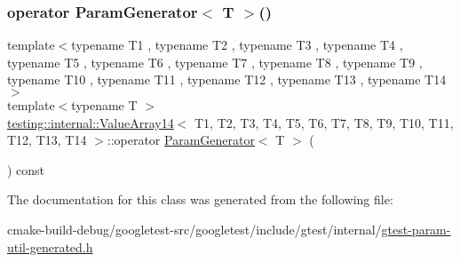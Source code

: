\subsubsection{\texorpdfstring{operator ParamGenerator$<$ T $>$()}{operator ParamGenerator< T >()}}
{\footnotesize\ttfamily template$<$typename T1 , typename T2 , typename T3 , typename T4 , typename T5 , typename T6 , typename T7 , typename T8 , typename T9 , typename T10 , typename T11 , typename T12 , typename T13 , typename T14 $>$ \\
template$<$typename T $>$ \\
\mbox{\hyperlink{classtesting_1_1internal_1_1ValueArray14}{testing\+::internal\+::\+Value\+Array14}}$<$ T1, T2, T3, T4, T5, T6, T7, T8, T9, T10, T11, T12, T13, T14 $>$\+::operator \mbox{\hyperlink{classtesting_1_1internal_1_1ParamGenerator}{Param\+Generator}}$<$ T $>$ (\begin{DoxyParamCaption}{ }\end{DoxyParamCaption}) const\hspace{0.3cm}{\ttfamily [inline]}}



The documentation for this class was generated from the following file\+:\begin{DoxyCompactItemize}
\item 
cmake-\/build-\/debug/googletest-\/src/googletest/include/gtest/internal/\mbox{\hyperlink{gtest-param-util-generated_8h}{gtest-\/param-\/util-\/generated.\+h}}\end{DoxyCompactItemize}
